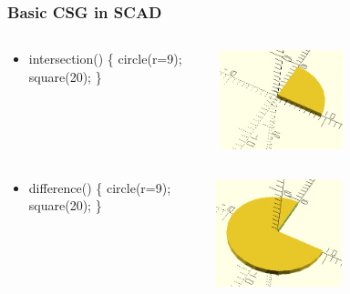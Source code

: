\documentclass{beamer}
\begin{document}
\begin{frame}
\frametitle{Basic CSG in SCAD}
\begin{columns}
  \begin{column}{0.5\textwidth}
    \begin{itemize}
    \item intersection() \{ circle(r=9); square(20); \} 
    \end{itemize}
  \end{column}
  \begin{column}{0.5\textwidth}
    \includegraphics[width=0.5\textwidth, right]{openscad-intersection_circle_9_square_20.png}
  \end{column}
\end{columns}
\begin{columns}
  \begin{column}{0.5\textwidth}
    \begin{itemize}
    \item difference() \{ circle(r=9); square(20); \}
    \end{itemize}
  \end{column}
  \begin{column}{0.5\textwidth}
    \includegraphics[width=0.5\textwidth, right]{openscad-difference_circle_9_square_20.png}
  \end{column}
\end{columns}
\end{frame}
\end{document}
